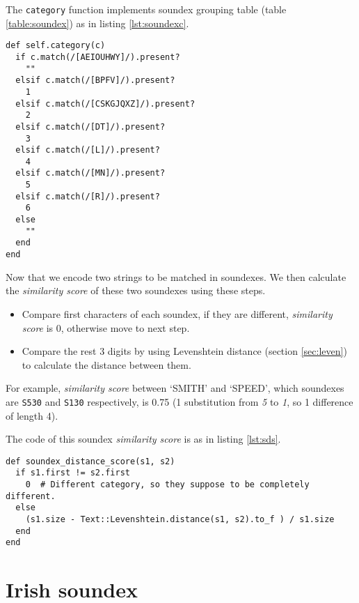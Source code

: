 The \texttt{category} function implements soundex grouping table (table \ref{table:soundex})
as in listing \ref{lst:soundexc}.

\begin{minipage}{\linewidth}
\begin{lstlisting}[label={lst:soundexc}, caption={Soundex grouping table implementation.}]
def self.category(c)
  if c.match(/[AEIOUHWY]/).present?
    ""
  elsif c.match(/[BPFV]/).present?
    1
  elsif c.match(/[CSKGJQXZ]/).present?
    2
  elsif c.match(/[DT]/).present?
    3
  elsif c.match(/[L]/).present?
    4
  elsif c.match(/[MN]/).present?
    5
  elsif c.match(/[R]/).present?
    6
  else
    ""
  end
end
\end{lstlisting}
\end{minipage}

Now that we encode two strings to be matched in soundexes.
We then calculate the \emph{similarity score} of these two soundexes using
these steps.

\begin{itemize}
  \item Compare first characters of each soundex, if they are different,
    \emph{similarity score} is 0, otherwise move to next step.
  \item Compare the rest 3 digits by using Levenshtein distance (section \ref{sec:leven})
    to calculate the distance between them.
\end{itemize}

For example, \emph{similarity score} between `SMITH' and `SPEED',
which soundexes are \texttt{S530} and \texttt{S130} respectively,
is 0.75 (1 substitution from \emph{5} to \emph{1}, so 1 difference of length 4).

The code of this soundex \emph{similarity score} is as in listing \ref{lst:sds}.

\begin{minipage}{\linewidth}
  \begin{lstlisting}[label={lst:sds}, caption={Soundex similarity score implementation.}]
def soundex_distance_score(s1, s2)
  if s1.first != s2.first
    0  # Different category, so they suppose to be completely different.
  else
    (s1.size - Text::Levenshtein.distance(s1, s2).to_f ) / s1.size
  end
end
\end{lstlisting}
\end{minipage}

\section{Irish soundex}

